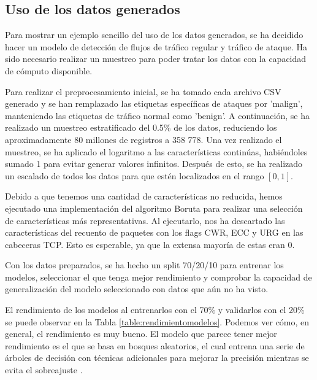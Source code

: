 \documentclass[10pt,a4paper,twoside]{article}
\begin{document}
\begin{multicols*}{2}
    \section{Uso de los datos generados} \label{casoml}

    Para mostrar un ejemplo sencillo del uso de los datos generados, se ha decidido hacer un modelo de detección de flujos de tráfico regular y tráfico de ataque. Ha sido necesario realizar un muestreo para poder tratar los datos con la capacidad de cómputo disponible. 

    Para realizar el preprocesamiento inicial, se ha tomado cada archivo CSV generado y se han remplazado las etiquetas específicas de ataques por 'malign', manteniendo las etiquetas de tráfico normal como 'benign'. A continuación, se ha realizado un muestreo estratificado del 0.5\% de los datos, reduciendo los aproximadamente 80 millones de registros a 358 778. Una vez realizado el muestreo, se ha aplicado el logaritmo a las características continúas, habiéndoles sumado 1 para evitar generar valores infinitos. Después de esto, se ha realizado un escalado de todos los datos para que estén localizados en el rango $[0, 1]$. 
    
    Debido a que tenemos una cantidad de características no reducida, hemos ejecutado una implementación del algoritmo Boruta \cite{borutapy} para realizar una selección de características más representativas. Al ejecutarlo, nos ha descartado las características del recuento de paquetes con los flags CWR, ECC y URG en las cabeceras TCP. Esto es esperable, ya que la extensa mayoría de estas eran 0.

    Con los datos preparados, se ha hecho un split 70/20/10 para entrenar los modelos, seleccionar el que tenga mejor rendimiento y comprobar la capacidad de generalización del modelo seleccionado con datos que aún no ha visto. 

    El rendimiento de los modelos al entrenarlos con el 70\% y validarlos con el 20\% se puede observar en la Tabla \ref{table:rendimientomodelos}. Podemos ver cómo, en general, el rendimiento es muy bueno. El modelo que parece tener mejor rendimiento es el que se basa en bosques aleatorios, el cual entrena una serie de árboles de decisión con técnicas adicionales para mejorar la precisión mientras se evita el sobreajuste \cite{sklearnrandomforest}.


\end{multicols*}
\end{document}

